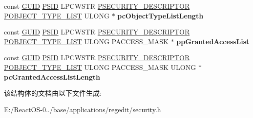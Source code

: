 \begin{DoxyCompactItemize}
\item 
\mbox{\label{structiface_i_effective_permission_vbtl_a84c21cf06bd0316d9e8919e625803044}} 
const \hyperlink{interface_g_u_i_d}{G\+U\+ID} \hyperlink{struct___s_i_d}{P\+S\+ID} L\+P\+C\+W\+S\+TR \hyperlink{struct___s_e_c_u_r_i_t_y___d_e_s_c_r_i_p_t_o_r}{P\+S\+E\+C\+U\+R\+I\+T\+Y\+\_\+\+D\+E\+S\+C\+R\+I\+P\+T\+OR} \hyperlink{struct___o_b_j_e_c_t___t_y_p_e___l_i_s_t}{P\+O\+B\+J\+E\+C\+T\+\_\+\+T\+Y\+P\+E\+\_\+\+L\+I\+ST} U\+L\+O\+NG $\ast$ {\bfseries pc\+Object\+Type\+List\+Length}
\item 
\mbox{\label{structiface_i_effective_permission_vbtl_a37e0455c1659316530c8896a66f72874}} 
const \hyperlink{interface_g_u_i_d}{G\+U\+ID} \hyperlink{struct___s_i_d}{P\+S\+ID} L\+P\+C\+W\+S\+TR \hyperlink{struct___s_e_c_u_r_i_t_y___d_e_s_c_r_i_p_t_o_r}{P\+S\+E\+C\+U\+R\+I\+T\+Y\+\_\+\+D\+E\+S\+C\+R\+I\+P\+T\+OR} \hyperlink{struct___o_b_j_e_c_t___t_y_p_e___l_i_s_t}{P\+O\+B\+J\+E\+C\+T\+\_\+\+T\+Y\+P\+E\+\_\+\+L\+I\+ST} U\+L\+O\+NG P\+A\+C\+C\+E\+S\+S\+\_\+\+M\+A\+SK $\ast$ {\bfseries pp\+Granted\+Access\+List}
\item 
\mbox{\label{structiface_i_effective_permission_vbtl_a179b344435de7b1aef863781c48dfde2}} 
const \hyperlink{interface_g_u_i_d}{G\+U\+ID} \hyperlink{struct___s_i_d}{P\+S\+ID} L\+P\+C\+W\+S\+TR \hyperlink{struct___s_e_c_u_r_i_t_y___d_e_s_c_r_i_p_t_o_r}{P\+S\+E\+C\+U\+R\+I\+T\+Y\+\_\+\+D\+E\+S\+C\+R\+I\+P\+T\+OR} \hyperlink{struct___o_b_j_e_c_t___t_y_p_e___l_i_s_t}{P\+O\+B\+J\+E\+C\+T\+\_\+\+T\+Y\+P\+E\+\_\+\+L\+I\+ST} U\+L\+O\+NG P\+A\+C\+C\+E\+S\+S\+\_\+\+M\+A\+SK U\+L\+O\+NG $\ast$ {\bfseries pc\+Granted\+Access\+List\+Length}
\end{DoxyCompactItemize}


该结构体的文档由以下文件生成\+:\begin{DoxyCompactItemize}
\item 
E\+:/\+React\+O\+S-\/0../base/applications/regedit/security.\+h\end{DoxyCompactItemize}
